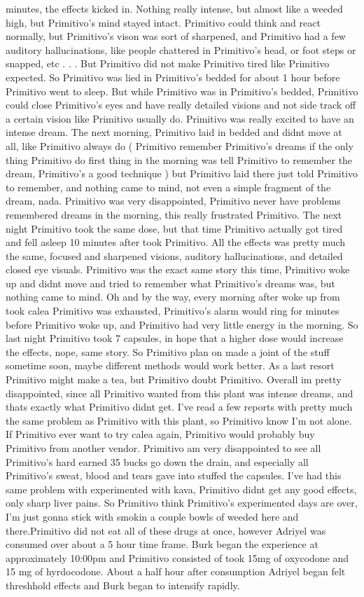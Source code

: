 \documentclass[12pt]{book}
\begin{document}
minutes, the effects kicked in. Nothing really intense, but almost like a weeded high, but Primitivo's mind stayed intact. Primitivo could think and react normally, but Primitivo's vison was sort of sharpened, and Primitivo had a few auditory hallucinations, like people chattered in Primitivo's head, or foot steps or snapped, etc . . .  But Primitivo did not make Primitivo tired like Primitivo expected. So Primitivo was lied in Primitivo's bedded for about 1 hour before Primitivo went to sleep. But while Primitivo was in Primitivo's bedded, Primitivo could close Primitivo's eyes and have really detailed visions and not side track off a certain vision like Primitivo usually do. Primitivo was really excited to have an intense dream. The next morning, Primitivo laid in bedded and didnt move at all, like Primitivo always do ( Primitivo remember Primitivo's dreams if the only thing Primitivo do first thing in the morning was tell Primitivo to remember the dream, Primitivo's a good technique ) but Primitivo laid there just told Primitivo to remember, and nothing came to mind, not even a simple fragment of the dream, nada. Primitivo was very disappointed, Primitivo never have problems remembered dreams in the morning, this really frustrated Primitivo. The next night Primitivo took the same dose, but that time Primitivo actually got tired and fell asleep 10 minutes after took Primitivo. All the effects was pretty much the same, focused and sharpened visions, auditory hallucinations, and detailed closed eye visuals. Primitivo was the exact same story this time, Primitivo woke up and didnt move and tried to remember what Primitivo's dreams was, but nothing came to mind. Oh and by the way, every morning after woke up from took calea Primitivo was exhausted, Primitivo's alarm would ring for minutes before Primitivo woke up, and Primitivo had very little energy in the morning. So last night Primitivo took 7 capsules, in hope that a higher dose would increase the effects, nope, same story. So Primitivo plan on made a joint of the stuff sometime soon, maybe different methods would work better. As a last resort Primitivo might make a tea, but Primitivo doubt Primitivo. Overall im pretty disappointed, since all Primitivo wanted from this plant was intense dreams, and thats exactly what Primitivo didnt get. I've read a few reports with pretty much the same problem as Primitivo with this plant, so Primitivo know I'm not alone. If Primitivo ever want to try calea again, Primitivo would probably buy Primitivo from another vendor. Primitivo am very disappointed to see all Primitivo's hard earned 35 bucks go down the drain, and especially all Primitivo's sweat, blood and tears gave into stuffed the capsules. I've had this same problem with experimented with kava, Primitivo didnt get any good effects, only sharp liver pains. So Primitivo think Primitivo's experimented days are over, I'm just gonna stick with smokin a couple bowls of weeded here and there.Primitivo did not eat all of these drugs at once, however Adriyel was consumed over about a 5 hour time frame. Burk began the experience at approximately 10:00pm and Primitivo consisted of took 15mg of oxycodone and 15 mg of hyrdocodone. About a half hour after consumption Adriyel began felt threshhold effects and Burk began to intensify rapidly. 
\end{document}

